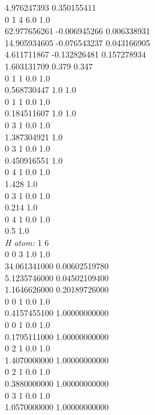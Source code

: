 \documentclass[11pt,DIV=13,BCOR=5mm,a4paper,headinclude]{scrbook}
\begin{document}
\begin{spacing}{0.5}
{4.976247393       0.350155411\\
0 1 4 6.0 1.0\\

62.977656261     -0.006945266     0.006338931\\

14.905934605     -0.076543237     0.043166905\\

4.611711867      -0.132826481     0.157278934\\

1.603131709       0.379           0.347\\
0 1 1 0.0 1.0\\

0.568730447       1.0             1.0\\
0 1 1 0.0 1.0\\

0.184511607       1.0             1.0\\
0 3 1 0.0 1.0\\

1.387304921       1.0\\
0 3 1 0.0 1.0\\

0.450916551       1.0\\
0 4 1 0.0 1.0\\

1.428             1.0\\
0 3 1 0.0 1.0\\

0.214             1.0\\
0 4 1 0.0 1.0\\

0.5               1.0\\

\textit{H atom: }
1 6\\
0 0 3 1.0 1.0\\

34.061341000 0.00602519780\\

5.1235746000 0.04502109400\\

1.1646626000 0.20189726000\\
0 0 1 0.0 1.0\\

0.4157455100 1.00000000000\\
0 0 1 0.0 1.0\\

0.1795111000 1.00000000000\\
0 2 1 0.0 1.0\\

1.4070000000 1.00000000000\\
0 2 1 0.0 1.0\\

0.3880000000 1.00000000000\\
0 3 1 0.0 1.0\\

1.0570000000 1.00000000000}
\end{spacing}
\def\thefigure{E.\arabic{figure}}
\def\thetable{E.\arabic{table}}
\end{document}

